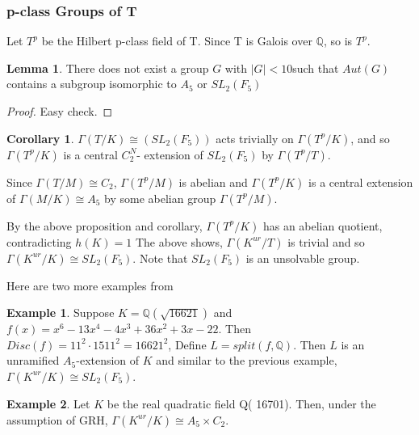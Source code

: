 \documentclass[12pt]{extarticle}
\newcommand{\Q}{\mathbb{Q}}
\newcommand{\<}{\langle}
\renewcommand{\>}{\rangle}
\theoremstyle{definition}
\newtheorem{corollary}{Corollary}
\newtheorem*{example}{Example}
\newtheorem{lemma}{Lemma}
\begin{document}
\subsubsection{p-class Groups of T}

Let $T^p$ be the Hilbert p-class field of T. Since T is Galois over $\Q$, so is $T^p$.
\begin{lemma}
There does not exist a group $G$ with $|G| < 10 $such that $Aut(G)$ contains a subgroup isomorphic to $A_5$ or $SL_2(F_5)$
\end{lemma}
\begin{proof}
Easy check. 
\end{proof}
\begin{corollary}
 $\Gamma(T/K) \cong (SL_2(F_5))$ acts trivially on $\Gamma(T^p/K)$, and so $\Gamma(T^p/K)$ is a central $C_2^N$- extension of $SL_2(F_5)$ by $\Gamma(T^p/T)$. \par
Since $\Gamma(T/M) \cong C_2$, $\Gamma(T^p/M)$ is abelian and $\Gamma(T^p/K)$ is a central extension of $\Gamma(M/K) \cong A_5$ by some abelian group $\Gamma(T^p/M)$.
\end{corollary}
 By the above proposition and corollary, $\Gamma(T^p/K)$ has an abelian quotient, contradicting $h(K)=1$
The above shows, $\Gamma(K^{ur}/T)$ is trivial and so $\Gamma(K^{ur}/K) \cong SL_2(F_5)$. Note that $SL_2(F_5)$ is an unsolvable group. 
 \par
Here are two more examples from \cite{KIM2017}
\begin{example}
Suppose $K = \Q(\sqrt{16621})$ and $f(x) = x^6-13x^4-4x^3 +36x^2 +3x-22$. Then $Disc(f) = 11^2 \cdot 1511^2 = 16621^2$, Define $L= split(f,\Q)$. Then $L$ is an unramified $A_5$-extension of $K$ and similar to the previous example, $\Gamma(K^{ur}/K) \cong SL_2(F_5)$.
\end{example}
\begin{example}
Let $K$ be the real quadratic field Q( 16701). Then, under the assumption of GRH,  $\Gamma(K^{ur}/K) \cong A_5 \times C_2$.
\end{example}
 
\end{document}
